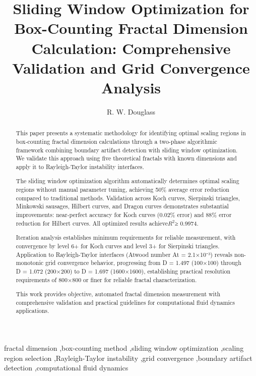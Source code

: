 \documentclass[preprint,12pt]{elsarticle}
\begin{document}
\begin{frontmatter}

\title{Sliding Window Optimization for Box-Counting Fractal Dimension Calculation: Comprehensive Validation and Grid Convergence Analysis}

\author{R. W. Douglass}



\begin{abstract}
This paper presents a systematic methodology for identifying optimal scaling regions in box-counting fractal dimension calculations through a two-phase algorithmic framework combining boundary artifact detection with sliding window optimization. We validate this approach using five theoretical fractals with known dimensions and apply it to Rayleigh-Taylor instability interfaces.

The sliding window optimization algorithm automatically determines optimal scaling regions without manual parameter tuning, achieving 50\% average error reduction compared to traditional methods. Validation across Koch curves, Sierpinski triangles, Minkowski sausages, Hilbert curves, and Dragon curves demonstrates substantial improvements: near-perfect accuracy for Koch curves (0.02\% error) and 88\% error reduction for Hilbert curves. All optimized results achieve$R^2$≥ 0.9974.

Iteration analysis establishes minimum requirements for reliable measurement, with convergence by level 6+ for Koch curves and level 3+ for Sierpinski triangles. Application to Rayleigh-Taylor interfaces (Atwood number At = 2.1×10⁻³) reveals non-monotonic grid convergence behavior, progressing from D = 1.497 (100×100) through D = 1.072 (200×200) to D = 1.697 (1600×1600), establishing practical resolution requirements of 800×800 or finer for reliable fractal characterization.

This work provides objective, automated fractal dimension measurement with comprehensive validation and practical guidelines for computational fluid dynamics applications.
\end{abstract}

\begin{keyword}
fractal dimension \sep box-counting method \sep sliding window optimization \sep scaling region selection \sep Rayleigh-Taylor instability \sep grid convergence \sep boundary artifact detection \sep computational fluid dynamics
\end{keyword}

\end{frontmatter}
\end{document}

